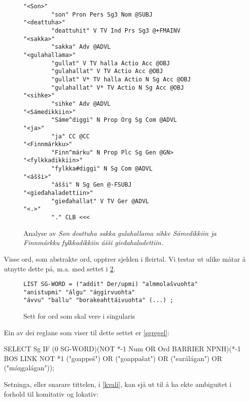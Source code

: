 \documentclass[a4paper,norsk]{article}
\begin{document}
\begin{figure}[htbp]
\begin{center}
\begin{verbatim}
"<Son>"
        "son" Pron Pers Sg3 Nom @SUBJ
"<deattuha>"
        "deattuhit" V TV Ind Prs Sg3 @+FMAINV
"<sakka>"
        "sakka" Adv @ADVL
"<gulahallama>"
        "gullat" V TV halla Actio Acc @OBJ
        "gulahallat" V TV Actio Acc @OBJ
        "gullat" V* TV halla Actio N Sg Acc @OBJ
        "gulahallat" V* TV Actio N Sg Acc @OBJ
"<sihke>"
        "sihke" Adv @ADVL
"<Sámedikkiin>"
        "Sáme^diggi" N Prop Org Sg Com @ADVL
"<ja>"
        "ja" CC @CC
"<Finnmárkku>"
        "Finn^márku" N Prop Plc Sg Gen @GN>
"<fylkkadikkiin>"
        "fylkka#diggi" N Sg Com @ADVL
"<ášši>"
        "ášši" N Sg Gen @-FSUBJ
"<gieđahaladettiin>"
        "gieđahallat" V TV Ger @ADVL
"<.>"
        "." CLB <<<
\end{verbatim}

\caption{Analyse av \emph{Son deattuha sakka gulahallama sihke Sámedikkiin ja Finnmárkku fylkkadikkiin ášši gieđahaladettiin.}}
\label{fylkeanalyse}
\end{center}
\end{figure}

Visse ord, som abstrakte ord, opptrer sjelden i fleirtal. Vi testar ut ulike måtar å utnytte dette på, m.a. med settet i \ref{sgwds}. %


\begin{figure}[htbp]
\begin{center}
\begin{verbatim}
LIST SG-WORD = ("addit" Der/upmi) "almmolašvuohta" "anistupmi" "álgu" "áŋgirvuohta" 
"ávvu" "ballu" "borakeahttáivuohta" (...) ;
\end{verbatim}
\caption{Sett for ord som skal vere i singularis}
\label{sgwds}
\end{center}
\end{figure}

Ein av dei reglane  som viser til dette settet er \ref{sgregel}: %

\begin{example}\label{sgregel}
SELECT Sg IF (0 SG-WORD)(NOT *-1 Num OR Ord BARRIER NPNH)(*-1 BOS LINK NOT *1 ("goappeš") OR ("goappašat") OR ("earálágan") OR ("máŋgalágan"));
\end{example}

Setninga, eller snarare tittelen, i \ref{kvali}, kan sjå ut til å ha ekte ambiguitet i forhold til komitativ og lokativ: %
\end{document}
